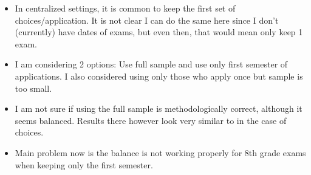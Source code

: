 \begin{itemize}
    \item In centralized settings, it is common to keep the first set of choices/application. It is not clear I can do the same here since I don't (currently) have dates of exams, but even then, that would mean only keep 1 exam.
    \item I am considering 2 options: Use full sample and use only first semester of applications. I also considered using only those who apply once but sample is too small.
    \item I am not sure if using the full sample is methodologically correct, although it seems balanced. Results there however look very similar to \cite{altmejd_o_2021} in the case of choices.
    \item Main problem now is the balance is not working properly for 8th grade exams when keeping only the first semester.
\end{itemize}



